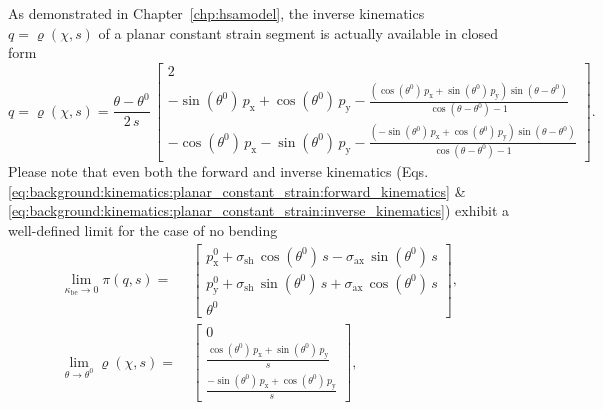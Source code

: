 As demonstrated in Chapter~\ref{chp:hsamodel}, the inverse kinematics $q = \varrho(\chi,s)$ of a planar constant strain segment is actually available in closed form
\begin{equation}\label{eq:background:kinematics:planar_constant_strain:inverse_kinematics}
    q = \varrho(\chi,s) = \frac{\theta-\theta^0}{2 \, s} \, \begin{bmatrix}
        2\\
        -\sin(\theta^0) \, p_\mathrm{x} + \cos(\theta^0) \, p_\mathrm{y} - \frac{\left (\cos(\theta^0) \, p_\mathrm{x} + \sin(\theta^0) \,  p_\mathrm{y} \right ) \sin(\theta-\theta^0)}{\cos(\theta-\theta^0)-1}\\
        -\cos(\theta^0) \, p_\mathrm{x} - \sin(\theta^0) \, p_\mathrm{y} - \frac{\left (-\sin(\theta^0) \, p_\mathrm{x} + \cos(\theta^0) \,  p_\mathrm{y} \right ) \sin(\theta-\theta^0)}{\cos(\theta-\theta^0)-1}
    \end{bmatrix}.
\end{equation}
Please note that even both the forward and inverse kinematics (Eqs. \eqref{eq:background:kinematics:planar_constant_strain:forward_kinematics} \& \eqref{eq:background:kinematics:planar_constant_strain:inverse_kinematics}) exhibit a well-defined limit for the case of no bending
\begin{equation}
\begin{split}
    \lim_{\kappa_\mathrm{be} \to 0} \pi(q,s) =& \: \begin{bmatrix}
        p_\mathrm{x}^0 + \sigma_\mathrm{sh} \, \cos(\theta^0) \, s - \sigma_\mathrm{ax} \, \sin(\theta^0) \, s\\
        p_\mathrm{y}^0 + \sigma_\mathrm{sh} \, \sin(\theta^0) \, s + \sigma_\mathrm{ax} \, \cos(\theta^0) \, s\\
        \theta^0
    \end{bmatrix}, \\
    \lim_{\theta \to \theta^0} \varrho(\chi,s) =& \: \begin{bmatrix}
        0\\
        \frac{\cos(\theta^0) \, p_\mathrm{x} + \sin(\theta^0) \,  p_\mathrm{y}}{s}\\
        \frac{-\sin(\theta^0) \, p_\mathrm{x} + \cos(\theta^0) \,  p_\mathrm{y}}{s}
    \end{bmatrix},\\
\end{split}
\end{equation}
